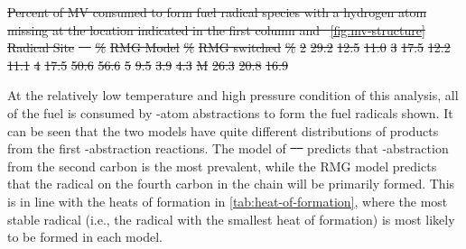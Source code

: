\documentclass[letterpaper, review, sort&compress]{elsarticle}
\providecommand{\DIFadd}[1]{{\protect\color{blue}\uwave{#1}}} %
\providecommand{\DIFdel}[1]{{\protect\color{red}\sout{#1}}}                      %
\providecommand{\DIFaddbegin}{} %
\providecommand{\DIFaddend}{} %
\providecommand{\DIFdelbegin}{} %
\providecommand{\DIFdelend}{} %
\newcommand{\DIFscaledelfig}{0.5}
\newlength{\DIFdelgraphicswidth} %
\newlength{\DIFdelgraphicsheight} %
\newcommand{\DIFaddincludegraphics}[2][]{{\color{blue}\fbox{\DIFOincludegraphics[#1]{#2}}}} %
\newcommand{\DIFdelincludegraphics}[2][]{%
\sbox{\DIFdelgraphicsbox}{\DIFOincludegraphics[#1]{#2}}%
\settoboxwidth{\DIFdelgraphicswidth}{\DIFdelgraphicsbox} %
\settoboxtotalheight{\DIFdelgraphicsheight}{\DIFdelgraphicsbox} %
\scalebox{\DIFscaledelfig}{%
\parbox[b]{\DIFdelgraphicswidth}{\usebox{\DIFdelgraphicsbox}\\[-\baselineskip] \rule{\DIFdelgraphicswidth}{0em}}\llap{\resizebox{\DIFdelgraphicswidth}{\DIFdelgraphicsheight}{%
\setlength{\unitlength}{\DIFdelgraphicswidth}%
\begin{picture}(1,1)%
\thicklines\linethickness{2pt} %
{\color[rgb]{1,0,0}\put(0,0){\framebox(1,1){}}}%
{\color[rgb]{1,0,0}\put(0,0){\line( 1,1){1}}}%
{\color[rgb]{1,0,0}\put(0,1){\line(1,-1){1}}}%
\end{picture}%
}\hspace*{3pt}}} %
} %
\DeclareRobustCommand{\DIFaddbegin}{\DIFOaddbegin \let\includegraphics\DIFaddincludegraphics} %
\DeclareRobustCommand{\DIFaddend}{\DIFOaddend \let\includegraphics\DIFOincludegraphics} %
\DeclareRobustCommand{\DIFdelbegin}{\DIFOdelbegin \let\includegraphics\DIFdelincludegraphics} %
\DeclareRobustCommand{\DIFdelend}{\DIFOaddend \let\includegraphics\DIFOincludegraphics} %
\begin{document}
\DIFdelbegin %
{%
\DIFdel{Percent of MV consumed to form fuel radical species with a hydrogen atom missing at
    the location indicated in the first column and \mbox{%
\cref{fig:mv-structure}}\hspace{0pt}%
}}
\DIFdel{Radical Site }%
\DIFdel{\mbox{%
\citet{Dievart2013} }\hspace{0pt}%
}%
\DIFdel{\si{\percent}}%
\DIFdel{RMG Model }%
\DIFdel{\si{\percent}}%
\DIFdel{RMG switched }%
\DIFdel{\si{\percent}}%
\DIFdel{2 }%
\DIFdel{29.2 }%
\DIFdel{12.5 }%
\DIFdel{11.0 }%
\DIFdel{3 }%
\DIFdel{17.5 }%
\DIFdel{12.2 }%
\DIFdel{11.1 }%
\DIFdel{4 }%
\DIFdel{17.5 }%
\DIFdel{50.6 }%
\DIFdel{56.6 }%
\DIFdel{5 }%
\DIFdel{9.5 }%
\DIFdel{3.9 }%
\DIFdel{4.3 }%
\DIFdel{M }%
\DIFdel{26.3 }%
\DIFdel{20.8 }%
\DIFdel{16.9 }%

\DIFdelend At the relatively low temperature and high pressure condition of this analysis, all of the fuel is
consumed by -atom abstractions to form the fuel radicals shown. It can be seen that the two
models have quite different distributions of products from the first -abstraction reactions.
The model of \DIFdelbegin \DIFdel{\mbox{%
\cite{Dievart2013} }\hspace{0pt}%
}\DIFdelend \DIFaddbegin \DIFadd{\mbox{%
\citet{Dievart2013} }\hspace{0pt}%
}\DIFaddend predicts that -abstraction from the second carbon is the most
prevalent, while the RMG model predicts that the radical on the fourth carbon in the chain will be
primarily formed. This is in line with the heats of formation in \cref{tab:heat-of-formation}, where
the most stable radical (i.e., the radical with the smallest heat of formation) is most likely to be
formed in each model.
\end{document}

